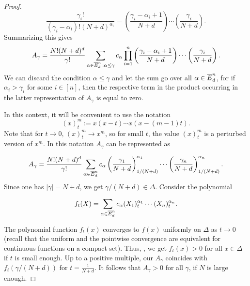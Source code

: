 \begin{proof}
	\[
		\frac{\gamma_i !}{(\gamma_i-\alpha_i)! (N+d)^{\alpha_i}} = \left(\frac{\gamma_i - \alpha_i+1}{N+d} \right) \cdots \left( \frac{\gamma_i}{N+d} \right).
	\]
	Summarizing this gives
	\[
		A_\gamma = \frac{N!(N+d)^d}{\gamma!} \sum_{\alpha \in \overline{E}^n_d \, : \alpha \le \gamma} c_\alpha \prod_{i=1}^n \left(\frac{\gamma_i - \alpha_i+1}{N+d} \right) \cdots \left( \frac{\gamma_i}{N+d} \right).
	\]
	We can discard the condition $\alpha \le \gamma$  and let the sum go over all $\alpha \in \overline{E}^n_d$, for if $\alpha_i > \gamma_i$ for some $i \in [n]$, then the respective term in the product occurring in the latter representation of $A_\gamma$ is equal to zero. 
	
	In this context, it will be convenient to use the notation
	\[
		(x)_t^m := x (x-t) \cdots x (x - (m-1) t).
	\]
	Note that for $t \to 0$, $(x)_t^m \to x^m$, so for small $t$, the value $(x)_t^m$ is a perturbed version of $x^m$. In this notation $A_\gamma$ can be represented as
	
	\[
		A_\gamma = \frac{N!(N+d)^d}{\gamma!} \sum_{\alpha \in \overline{E}^n_d} c_\alpha \left(\frac{\gamma_1}{N+d} \right)_{1/(N+d)}^{\alpha_1} \cdots  \left(\frac{\gamma_n}{N+d} \right)_{1/(N+d)}^{\alpha_n}.
	\]	
	Since one has $|\gamma|= N+d$, we get $\gamma / (N+d) \in \Delta$. Consider the polynomial
	
	\[
		f_t(X) = \sum_{\alpha \in \overline{E}^n_d} c_\alpha (X_1)_t^{\alpha_1} \cdots (X_n)_t^{\alpha_n}.
	\]
	
	The polynomial function $f_t(x)$ converges to $f(x)$ uniformly on $\Delta$ as $t \rightarrow 0$ (recall that the uniform and the pointwise convergence are equivalent for continuous functions on a compact set). Thus, , we get $f_t(x)>0$ for all $x \in \Delta$ if $t$ is small enough. Up to a positive multiple, our $A_\gamma$ coincides with $f_t(\gamma/ (N+d))$ for $t=\frac{1}{N+d}$. It follows that $A_\gamma  > 0$ for all $\gamma$, if $N$ is large enough. 
\end{proof}

\begin{remark}

\end{remark}

